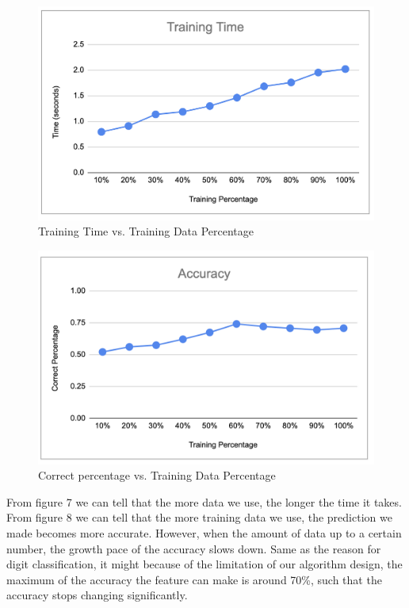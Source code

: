 \documentclass[11pt]{report}
\begin{document}
\begin{figure}[h]
\begin{center}
\includegraphics[scale=0.5]{Bayes_face_traintime.png} 
\end{center}
\caption{Training Time vs. Training Data Percentage}
\end{figure}
\newpage
\begin{figure}[t]
\begin{center}
\includegraphics[scale=0.45]{Bayes_face_accuracy.png} 
\end{center}
\caption{Correct percentage vs. Training Data Percentage}
\end{figure}


From figure 7 we can tell that the more data we use, the longer the time it takes.\\

From figure 8 we can tell that the more training data we use, the prediction we made becomes more accurate. However, when the amount of data up to a certain number, the growth pace of the accuracy slows down. Same as the reason for digit classification, it might because of the limitation of our algorithm design, the maximum of the accuracy the feature can make is around 70\%, such that the accuracy stops changing significantly. 
\end{document}

